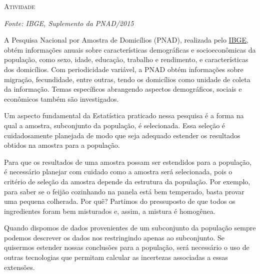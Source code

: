 \documentclass[10 pt,usenames,dvipsnames, oneside]{article}
\begin{document}
\bigskip
\begin{center}
{\large \scshape Atividade}
\end{center}
\fi

\textit{Fonte: IBGE, Suplemento da PNAD/2015}
\vspace{.5em}

A Pesquisa Nacional por Amostra de Domicílios (PNAD), realizada pelo \href{https://www.ibge.gov.br/estatisticas-novoportal/sociais/populacao/9127-pesquisa-nacional-por-amostra-de-domicilios.html}{IBGE}, obtém informações anuais sobre características demográficas e socioeconômicas da população, como sexo, idade, educação, trabalho e rendimento, e características dos domicílios. Com periodicidade variável, a PNAD obtém informações sobre migração, fecundidade, entre outras, tendo os domicílios como unidade de coleta da informação. Temas específicos abrangendo aspectos demográficos, sociais e econômicos também são investigados.

Um aspecto fundamental da Estatística praticado nessa pesquisa é a forma na qual a amostra, subconjunto da população, é selecionada. Essa seleção é cuidadosamente planejada de modo que seja adequado estender os resultados obtidos na amostra para a população.

Para que os resultados de uma amostra possam ser estendidos para a população, é necessário planejar com cuidado como a amostra será selecionada, pois o critério de seleção da amostra depende da estrutura da população. Por exemplo, para saber se o feijão cozinhando na panela está bem temperado, basta provar uma pequena colherada. Por quê?  Partimos do pressuposto de que todos os ingredientes foram bem misturados e, assim, a mistura é homogênea.

Quando dispomos de dados provenientes de um subconjunto da população sempre podemos descrever os dados nos restringindo apenas ao subconjunto. Se quisermos estender nossas conclusões para a população, será necessário o uso de outras tecnologias que permitam calcular as incertezas associadas a essas extensões.
\end{document}

